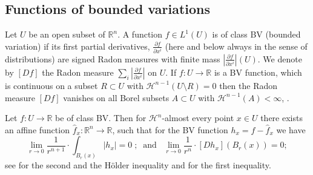 \documentclass[12pt,leqno,intlimits]{amsart}
\numberwithin{equation}{section}
\theoremstyle{definition}
\theoremstyle{remark}
\newtheorem{rem}[thm]{Remark}
\newcommand{\R}{\mathbb{R}}
\def\co{\colon\thinspace}
\def\:{\colon}
\begin{document}

\subsection{Functions of bounded variations}
Let $U$ be an open subset of $\R^n$. A function $f\in L^1 (U)$ is of class BV (bounded variation) if its first partial derivatives,
$\frac{\partial f}{\partial x^i}$ (here and below always in the sense of distributions) are signed Radon measures with finite mass
$|\frac{\partial f}{\partial x^i}|(U)$. We denote by $[Df ]$ the Radon measure $\sum_i |\frac{\partial f}{\partial x^i}|$ on $U$. 
If $f\:U\to \R$ is a BV function, which is continuous on a subset $R \subset U$ with $\mathcal H^{n-1} (U\setminus R)=0$ then the Radon measure $[Df]$ vanishes on all Borel subsets $A\subset U$ with $\mathcal H^{n-1} (A)<\infty$, \cite{Goffmann}.

Let $f\:U\to \R$ be of class BV. Then for $\mathcal H^n$-almost every point
$x\in U$ there exists an affine function $\hat f _x\:\R^n\to \R$, such that for the BV function $h_x=f-\hat f_x$ we have
\begin{equation}\label{DC-ae-diff}
\lim_{r\to 0}\frac 1 {r^{n+1}}\cdot \int _{B_r(x)}|h_x| =0 \; ;\; \; \text{and} \; \; \; \lim _{r\to 0} \frac 1 {r^n} \cdot [Dh_x] (B_r (x)) =0;
\end{equation}
see \cite[ Theorem 6.1 (2),(3)]{Evans} for the second and the H\"older inequality and \cite[ Theorem 6.1 (1)]{Evans} for the first inequality.

\end{document}
